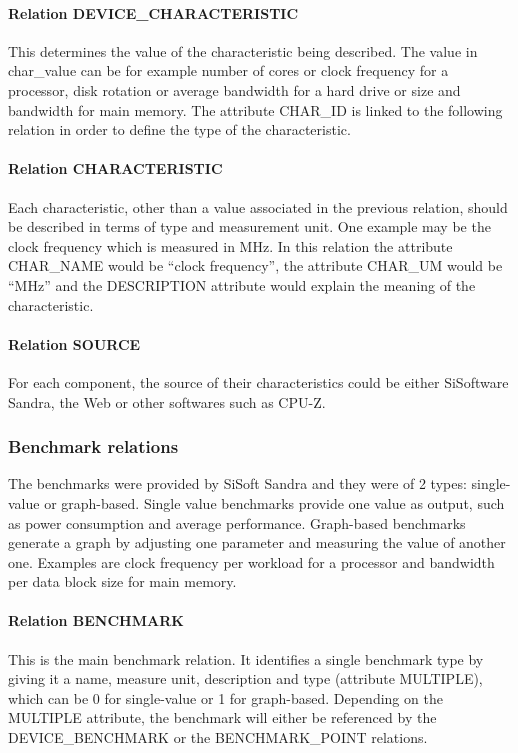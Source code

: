         \paragraph*{Relation DEVICE\_CHARACTERISTIC}
            This determines the value of the characteristic being described. The value in char\_value can be for example number of cores or clock frequency for a processor, disk rotation or average bandwidth for a hard drive or size and bandwidth for main memory. The attribute CHAR\_ID is linked to the following relation in order to define the type of the characteristic.
            
        \paragraph*{Relation CHARACTERISTIC}
            Each characteristic, other than a value associated in the previous relation, should be described in terms of type and measurement unit. One example may be the clock frequency which is measured in MHz. In this relation the attribute CHAR\_NAME would be ``clock frequency'', the attribute CHAR\_UM would be ``MHz'' and the DESCRIPTION attribute would explain the meaning of the characteristic.
            
        \paragraph*{Relation SOURCE}
            For each component, the source of their characteristics could be either SiSoftware Sandra, the Web or other softwares such as CPU-Z.
            
    \subsubsection*{Benchmark relations}
        The benchmarks were provided by SiSoft Sandra and they were of 2 types: single-value or graph-based. Single value benchmarks provide one value as output, such as power consumption and average performance. Graph-based benchmarks generate a graph by adjusting one parameter and measuring the value of another one. Examples are clock frequency per workload for a processor and bandwidth per data block size for main memory.
        \paragraph*{Relation BENCHMARK}
            This is the main benchmark relation. It identifies a single benchmark type by giving it a name, measure unit, description and type (attribute MULTIPLE), which can be 0 for single-value or 1 for graph-based. Depending on the MULTIPLE attribute, the benchmark will either be referenced by the DEVICE\_BENCHMARK or the BENCHMARK\_POINT relations.

